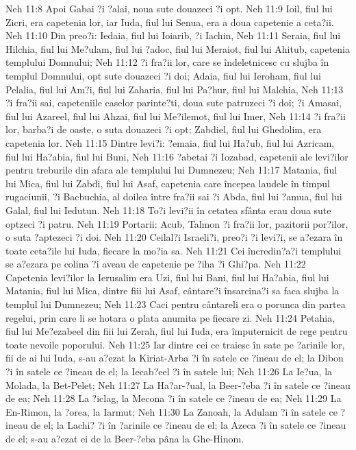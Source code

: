 Neh 11:8  Apoi Gabai ?i ?alai, noua sute douazeci ?i opt.
Neh 11:9  Ioil, fiul lui Zicri, era capetenia lor, iar Iuda, fiul lui Senua, era a doua capetenie a ceta?ii.
Neh 11:10  Din preo?i: Iedaia, fiul lui Ioiarib, ?i Iachin,
Neh 11:11  Seraia, fiul lui Hilchia, fiul lui Me?ulam, fiul lui ?adoc, fiul lui Meraiot, fiul lui Ahitub, capetenia templului Domnului;
Neh 11:12  ?i fra?ii lor, care se îndeletnicesc cu slujba în templul Domnului, opt sute douazeci ?i doi; Adaia, fiul lui Ieroham, fiul lui Pelalia, fiul lui Am?i, fiul lui Zaharia, fiul lui Pa?hur, fiul lui Malchia,
Neh 11:13  ?i fra?ii sai, capeteniile caselor parinte?ti, doua sute patruzeci ?i doi; ?i Amasai, fiul lui Azareel, fiul lui Ahzai, fiul lui Me?ilemot, fiul lui Imer,
Neh 11:14  ?i fra?ii lor, barba?i de oaste, o suta douazeci ?i opt; Zabdiel, fiul lui Ghedolim, era capetenia lor.
Neh 11:15  Dintre levi?i: ?emaia, fiul lui Ha?ub, fiul lui Azricam, fiul lui Ha?abia, fiul lui Buni,
Neh 11:16  ?abetai ?i Iozabad, capetenii ale levi?ilor pentru treburile din afara ale templului lui Dumnezeu;
Neh 11:17  Matania, fiul lui Mica, fiul lui Zabdi, fiul lui Asaf, capetenia care începea laudele în timpul rugaciunii, ?i Bacbuchia, al doilea între fra?ii sai ?i Abda, fiul lui ?amua, fiul lui Galal, fiul lui Iedutun.
Neh 11:18  To?i levi?ii în cetatea sfânta erau doua sute optzeci ?i patru.
Neh 11:19  Portarii: Acub, Talmon ?i fra?ii lor, pazitorii por?ilor, o suta ?aptezeci ?i doi.
Neh 11:20  Ceilal?i Israeli?i, preo?i ?i levi?i, se a?ezara în toate ceta?ile lui Iuda, fiecare la mo?ia sa.
Neh 11:21  Cei încredin?a?i templului se a?ezara pe colina ?i aveau de capetenie pe ?iha ?i Ghi?pa.
Neh 11:22  Capetenia levi?ilor la Ierusalim era Uzi, fiul lui Bani, fiul lui Ha?abia, fiul lui Matania, fiul lui Mica, dintre fiii lui Asaf, cântare?i însarcina?i sa faca slujba la templul lui Dumnezeu;
Neh 11:23  Caci pentru cântareli era o porunca din partea regelui, prin care li se hotara o plata anumita pe fiecare zi.
Neh 11:24  Petahia, fiul lui Me?ezabeel din fiii lui Zerah, fiul lui Iuda, era împuternicit de rege pentru toate nevoile poporului.
Neh 11:25  Iar dintre cei ce traiesc în sate pe ?arinile lor, fii de ai lui Iuda, s-au a?ezat la Kiriat-Arba ?i în satele ce ?ineau de el; la Dibon ?i în satele ce ?ineau de el; la Iecab?eel ?i în satele lui;
Neh 11:26  La Ie?ua, la Molada, la Bet-Pelet;
Neh 11:27  La Ha?ar-?ual, la Beer-?eba ?i în satele ce ?ineau de ea;
Neh 11:28  La ?iclag, la Mecona ?i în satele ce ?ineau de ea;
Neh 11:29  La En-Rimon, la ?orea, la Iarmut;
Neh 11:30  La Zanoah, la Adulam ?i în satele ce ?ineau de el; la Lachi? ?i în ?arinile ce ?ineau de el; la Azeca ?i în satele ce ?ineau de el; s-au a?ezat ei de la Beer-?eba pâna la Ghe-Hinom.
